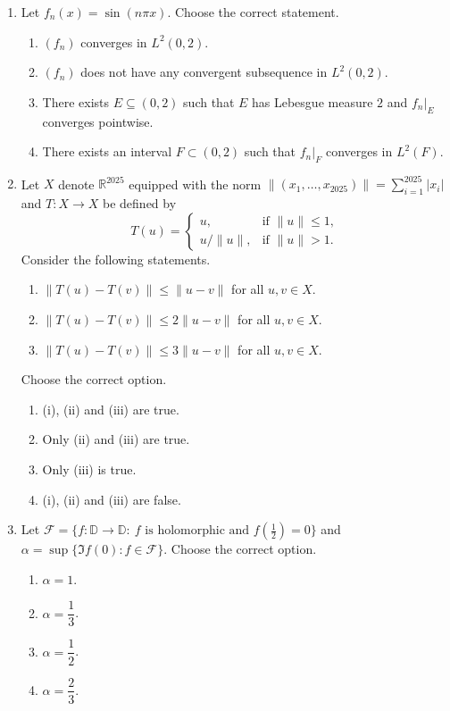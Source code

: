 \documentclass[11pt, a4paper]{article}
\begin{document}
\begin{enumerate}[resume]
\item Let $f_n(x)=\sin(n\pi x)$. Choose the correct statement.
\begin{enumerate}[label=(\alph*)]
\item $(f_n)$ converges in $L^2(0,2)$.
\item $(f_n)$ does not have any convergent subsequence in $L^2(0,2)$.
\item There exists $E\subseteq(0,2)$ such that $E$ has Lebesgue measure $2$ and $f_n|_E$ converges pointwise.
\item There exists an interval $F\subset(0,2)$ such that $f_n|_F$ converges in $L^2(F)$.
\end{enumerate}

\item Let $X$ denote $\mathbb{R}^{2025}$ equipped with the norm $\|(x_1,\ldots,x_{2025})\|=\sum_{i=1}^{2025}|x_i|$ and $T:X\to X$ be defined by
\[ T(u)=\begin{cases}u,&\text{if }\|u\|\le1,\\ u/\|u\|,&\text{if }\|u\|>1.\end{cases} \]
Consider the following statements.
\begin{enumerate}[label=(\roman*)]
\item $\|T(u)-T(v)\|\le\|u-v\|$ for all $u,v\in X$.
\item $\|T(u)-T(v)\|\le2\|u-v\|$ for all $u,v\in X$.
\item $\|T(u)-T(v)\|\le3\|u-v\|$ for all $u,v\in X$.
\end{enumerate}
Choose the correct option.
\begin{enumerate}[label=(\alph*)]
\item (i), (ii) and (iii) are true.
\item Only (ii) and (iii) are true.
\item Only (iii) is true.
\item (i), (ii) and (iii) are false.
\end{enumerate}

\item Let $\mathcal F=\{f:\mathbb{D}\to\mathbb{D}:\ f \text{ is holomorphic and } f(\tfrac12)=0\}$ and $\alpha=\sup\{\Im f(0):f\in\mathcal F\}$. Choose the correct option.
\begin{enumerate}[label=(\alph*)]
\item $\alpha=1$.
\item $\alpha=\dfrac13$.
\item $\alpha=\dfrac12$.
\item $\alpha=\dfrac23$.
\end{enumerate}


\end{enumerate}
\end{document}
